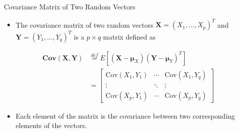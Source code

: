 \documentclass[
  ignorenonframetext,
]{beamer}
\providecommand{\tightlist}{%
  \setlength{\itemsep}{0pt}\setlength{\parskip}{0pt}}
\begin{document}
\begin{frame}{Covariance Matrix of Two Random Vectors}
\protect\hypertarget{covariance-matrix-of-two-random-vectors}{}
\begin{itemize}
\tightlist
\item
  The covariance matrix of two random vectors
  \(\mathbf{X}=(X_1,\dots,X_p)^T\) and \(\mathbf{Y}=(Y_1,\dots,Y_q)^T\)
  is a \(p\times q\) matrix defined as
\end{itemize}

\[
\begin{aligned}
\mathbf{Cov}(\mathbf{X},\mathbf{Y}) & \overset{def}= E[(\mathbf X-\boldsymbol \mu_X)(\mathbf Y-\boldsymbol \mu_Y)^T]\\
&= \begin{bmatrix} \text{Cov}(X_1,Y_1) & \cdots & \text{Cov}(X_1,Y_q) \\ \vdots & \ddots & \vdots \\ \text{Cov}(X_p,Y_1) & \cdots & \text{Cov}(X_p,Y_q) \end{bmatrix}
\end{aligned}
\]

\begin{itemize}
\tightlist
\item
  Each element of the matrix is the covariance between two corresponding
  elements of the vectors.
\end{itemize}
\end{frame}
\end{document}
